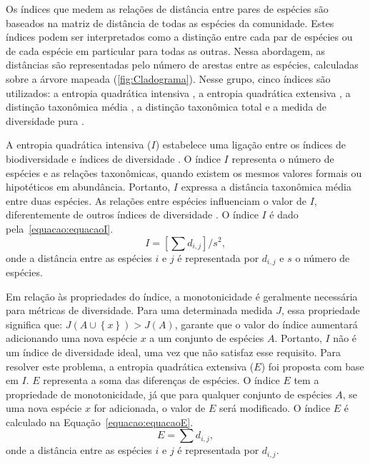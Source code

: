 Os índices que medem as relações de distância entre pares de espécies são baseados na matriz de distância de todas as espécies da comunidade. Estes índices podem ser interpretados como a distinção entre cada par de espécies ou de cada espécie em particular para todas as outras. Nessa abordagem, as distâncias são representadas pelo número de arestas entre as espécies, calculadas sobre a árvore mapeada (\autoref{fig:Cladograma}). Nesse grupo, cinco índices são utilizados: a entropia quadrática intensiva \cite{izsak2000link}, a entropia quadrática extensiva \cite{izsak2000link}, a distinção taxonômica média \cite{pienkowski1998taxonomic}, a distinção taxonômica total \cite{krwarwick} e a medida de diversidade pura \cite{gerlinger2012intratumor}.

A entropia quadrática intensiva ($I$) estabelece uma ligação entre os índices de biodiversidade e índices de diversidade \cite{izsak2000link}. O índice $I$ representa o número de espécies e as relações taxonômicas, quando existem os mesmos valores formais ou hipotéticos em abundância. Portanto, $I$ expressa a distância taxonômica média entre duas espécies. As relações entre espécies influenciam o valor de $I$, diferentemente de outros índices de diversidade \cite{izsak2000link}. O índice $I$ é dado pela~\autoref{equacao:equacaoI}.
\begin{equation}
\label{equacao:equacaoI}
I = \left [ \sum d_{i,j} \right ] / s^{2},
\end{equation}
onde a distância entre as espécies $i$ e $j$ é representada por $d_{i,j}$ e $s$ o número de espécies.

Em relação às propriedades do índice, a monotonicidade é geralmente necessária para métricas de diversidade. Para uma determinada medida $J$, essa propriedade significa que: $J (A \cup \left \{ x \right \}) > J(A)$, garante que o valor do índice aumentará adicionando uma nova espécie $x$ a um conjunto de espécies $A$. Portanto, $I$ não é um índice de diversidade ideal, uma vez que não satisfaz esse requisito. Para resolver este problema, a entropia quadrática extensiva ($E$) \cite{izsak2000link} foi proposta com base em $I$. $E$ representa a soma das diferenças de espécies. O índice $E$ tem a propriedade de monotonicidade, já que para qualquer conjunto de espécies $A$, se uma nova espécie $x$ for adicionada, o valor de $E$ será modificado. O índice $E$ é calculado na Equação~\ref{equacao:equacaoE}.
\begin{equation}
\label{equacao:equacaoE}
E = \sum d_{i,j},
\end{equation}
onde a distância entre as espécies $i$ e $j$ é representada por $d_{i,j}$.

